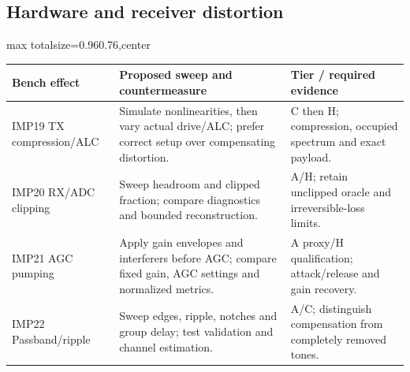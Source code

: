 \documentclass[11pt,a4paper]{article}
\newlength{\tableavail}
\renewcommand{\arraystretch}{1.13}
\begin{document}
\begin{landscape}\thispagestyle{plain}\centering
\subsection{Hardware and receiver distortion}

\setlength{\tabcolsep}{5pt}\renewcommand{\arraystretch}{1.25}
\setlength{\tableavail}{\dimexpr\linewidth-4\tabcolsep\relax}
\begin{adjustbox}{max totalsize={0.96\linewidth}{0.76\textheight},center}
\begin{tabular}{@{}>{\raggedright\arraybackslash}p{0.23\tableavail}>{\raggedright\arraybackslash}p{0.54\tableavail}>{\raggedright\arraybackslash}p{0.23\tableavail}@{}}
\toprule
\textbf{Bench effect} & \textbf{Proposed sweep and countermeasure} & \textbf{Tier / required evidence}\\
\midrule
IMP19 TX compression/ALC & Simulate nonlinearities, then vary actual drive/ALC; prefer correct setup over compensating distortion. & C then H; compression, occupied spectrum and exact payload.\\[5pt]
IMP20 RX/ADC clipping & Sweep headroom and clipped fraction; compare diagnostics and bounded reconstruction. & A/H; retain unclipped oracle and irreversible-loss limits.\\[5pt]
IMP21 AGC pumping & Apply gain envelopes and interferers before AGC; compare fixed gain, AGC settings and normalized metrics. & A proxy/H qualification; attack/release and gain recovery.\\[5pt]
IMP22 Passband/ripple & Sweep edges, ripple, notches and group delay; test validation and channel estimation. & A/C; distinguish compensation from completely removed tones.\\[5pt]
\bottomrule
\end{tabular}
\end{adjustbox}
\end{landscape}
\end{document}
